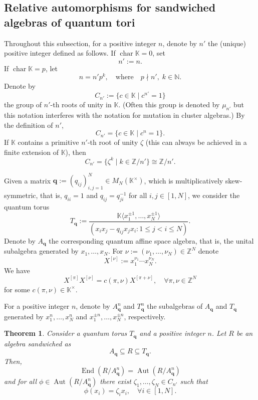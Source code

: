 \documentclass[11pt]{amsart}
\theoremstyle{plain}
\newtheorem{theorem}{Theorem}[section]
\newcommand \bth[1] { \begin{theorem}\label{t#1} }
\renewcommand {\eth} { \end{theorem} }
\def \KK {{\mathbb C}}
\def \KK {{\mathbb K}}
\def \Zset {{\mathbb Z}}
\def \Nset {{\mathbb N}}
\DeclareMathOperator \Aut { {\mathrm{Aut}} }
\DeclareMathOperator \charr { {\mathrm{char}} }
\DeclareMathOperator \End { {\mathrm{End}} }
\begin{document}
\subsection{Relative automorphisms for sandwiched algebras of quantum tori}
Throughout this subsection, for a positive integer $n$, denote by $n'$ the (unique) positive integer defined as follows. If $\charr \KK =0$, set 
\begin{equation}
    \label{nn'1}
n' := n.
\end{equation}
If $\charr \KK = p$, let
\begin{equation}
    \label{nn'2}
n = n' p^k, \quad \mbox{where} \quad p \nmid n', \; k \in \Nset.
\end{equation}
Denote by 
\begin{equation}
\label{mun}
C_{n'} := \{ c \in \KK \mid c^{n'} = 1 \} 
\end{equation}
the group of $n'$-th roots of unity in $\KK$.
(Often this group is denoted by $\mu_{n'}$ but this notation interferes with the notation for mutation in cluster algebras.) By the definition of $n'$, 
\[
C_{n'} = \{ c \in \KK \mid c^n = 1 \}.
\]
If $\KK$ contains a primitive $n'$-th root of unity $\zeta$ (this can always be achieved in a finite extension of $\KK$), then  
\[
C_{n'} = \{ \zeta^k \mid k \in \Zset/n' \} \cong \Zset/ n'.
\]

Given a matrix ${\mathbf{q}}:=(q_{ij})_{i,j=1}^N \in M_N(\KK^\times)$, which is multiplicatively skew-symmetric, that is,  
$q_{ii} =1$ and 
$q_{ij} = q_{ji}^{-1}$ for all $i, j \in [1,N]$, we consider the quantum torus 
\[
T_{\mathbf{q}}:= \frac{\KK \langle x_1^{\pm 1}, \ldots,  x_N^{\pm 1} \rangle}{(x_i x_j -q_{ij} x_j x_i  :  1 \leq j < i \leq N)}.
\]
Denote by $A_{\mathbf{q}}$ the corresponding quantum affine space algebra, that is, the unital subalgebra generated by $x_1, \ldots, x_N$. For $\nu:=(\nu_1, \ldots, \nu_N) \in \Zset^N$ denote 
\[
X^{[\nu]}:=x_1^{\nu_1} \cdots x_N^{\nu_N}.
\]
We have 
\begin{equation}
\label{mult-non-norm}
X^{[\pi]} X^{[\nu]} = c(\pi, \nu) X^{[\pi + \nu]}, \quad \forall \pi, \nu \in \Zset^N
\end{equation}
for some $c(\pi,\nu) \in \KK^\times$.
\medskip

For a positive integer $n$, denote by $A_{\mathbf{q}}^n$ and 
$T_{\mathbf{q}}^n$ the subalgebras of 
$A_{\mathbf{q}}$ and $T_{\mathbf{q}}$ generated by 
$x_1^n, \ldots, x_N^n$ and $x_1^{\pm n}, \ldots, x_N^{\pm n}$, respectively. 

\bth{gen} Consider a quantum torus $T_{\mathbf{q}}$ and a positive integer $n$. Let $R$ be an algebra 
sandwiched as
\[
A_{\mathbf{q}} \subseteq R \subseteq T_{\mathbf{q}}.
\]
Then, 
\[
\End(R/A_{\mathbf{q}}^n) = \Aut(R/A_{\mathbf{q}}^n)
\]
and for all $\phi \in \Aut(R/A_{\mathbf{q}}^n)$ there exist 
$\zeta_1, \ldots, \zeta_N \in C_{n'}$ such that 
\[
\phi(x_i) = \zeta_i x_i, \quad \forall i \in [1,N].
\]
\eth
\end{document}
